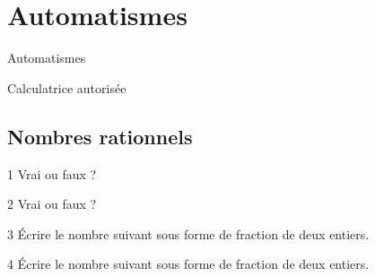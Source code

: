 
\AdvanceDate[2]



\section{Automatismes}

\begin{frame}

\centering \huge
Automatismes

\large
Calculatrice autorisée

\end{frame}

\subsection{Nombres rationnels}

\begin{frame}{1\vspace{-32pt}}
	Vrai ou faux ?
	\vfill
\end{frame}

\begin{frame}{2\vspace{-32pt}}
	Vrai ou faux ?
	\vfill
\end{frame}

\begin{frame}{3\vspace{-32pt}}
	Écrire le nombre suivant sous forme de fraction de deux entiers.
	\vfill
\end{frame}

\begin{frame}{4\vspace{-32pt}}
	Écrire le nombre suivant sous forme de fraction de deux entiers.
	\vfill
\end{frame}
